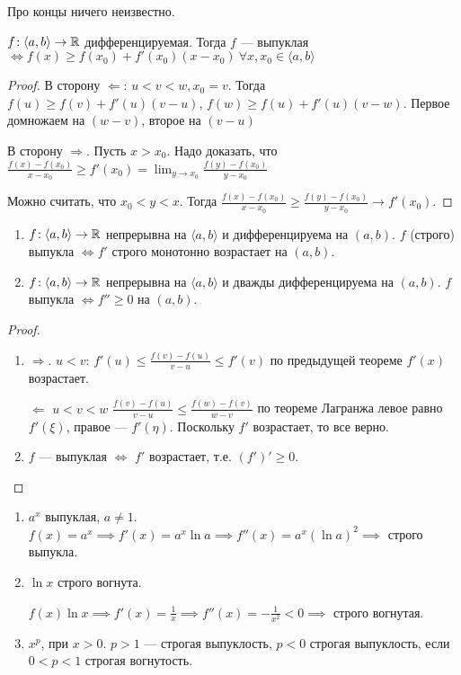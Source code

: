 \begin{remark}
    Про концы ничего неизвестно.
\end{remark}
\begin{theorem}
    $f\!: \langle a, b \rangle \to \mathbb{R}$ дифференцируемая. Тогда  $f$ --- выпуклая  $\iff f(x) \ge f(x_0) + f'(x_0)(x - x_0)\ \forall x, x_0 \in \langle a, b \rangle$
\end{theorem}
\begin{proof}
    В сторону $\Leftarrow$:  $u < v < w, x_0=v$. Тогда  $f(u) \ge f(v) + f'(u)(v-u)$, $f(w) \ge f(u) + f'(u)(v-w)$. Первое домножаем на $(w-v)$, второе на  $(v - u)$

    В сторону  $\Rightarrow$. Пусть  $x > x_0$. Надо доказать, что $\frac{f(x) - f(x_0)}{x - x_0} \ge f'(x_0) = \lim_{y \to x_0} \frac{f(y)-f(x_0)}{y-x_0}$ 

    Можно считать, что $x_0 < y < x$. Тогда  $\frac{f(x) - f(x_0)}{x - x_0} \ge \frac{f(y) - f(x_0)}{y - x_0} \to f'(x_0)$.
\end{proof}
\begin{theorem}
    \begin{enumerate}
        \item $f\!:\langle a, b \rangle \to \mathbb{R}$ непрерывна на  $\langle a, b \rangle$ и дифференцируема на  $(a, b)$.  $f$ (строго) выпукла $\iff f'$ строго монотонно возрастает на $(a, b)$.
        \item $f\!:\langle a, b \rangle \to \mathbb{R}$ непрерывна на  $\langle a, b \rangle$ и дважды дифференцируема на  $(a, b)$.  $f$ выпукла $\iff f'' \ge 0$ на $(a, b)$.
    \end{enumerate}
\end{theorem}
\begin{proof}
    \begin{enumerate}
        \item $\Rightarrow$.  $u < v$:  $f'(u) \le \frac{f(v) - f(u)}{v - u} \le f'(v)$ по предыдущей теореме $f'(x)$ возрастает.

            $\Leftarrow$  $u < v < w$  $\frac{f(v) - f(u)}{v-u} \le \frac{f(w) - f(v)}{w-v}$ по теореме Лагранжа левое равно $f'(\xi)$, правое ---  $f'(\eta)$. Поскольку  $f'$ возрастает, то все верно.

        \item  $f$ --- выпуклая  $\iff$  $f'$ возрастает, т.е. $(f')' \ge 0$.
    \end{enumerate}
\end{proof}
\begin{example}
     \begin{enumerate}
         \item $a^x$ выпуклая,  $a \neq 1$.  $f(x) = a^x \implies f'(x) = a^x\ln a \implies f''(x) = a^x(\ln a)^2 \implies$ строго выпукла.
         \item  $\ln x$ строго вогнута.

             $f(x) \ln x \implies f'(x) = \frac{1}{x} \implies f''(x) = -\frac{1}{x^2} < 0 \implies$ строго вогнутая.
         \item $x^p$, при  $x > 0$.  $p > 1$ --- строгая выпуклость,  $p < 0$ строгая выпуклость, если $0 < p < 1$ строгая вогнутость.
    \end{enumerate}
\end{example}
